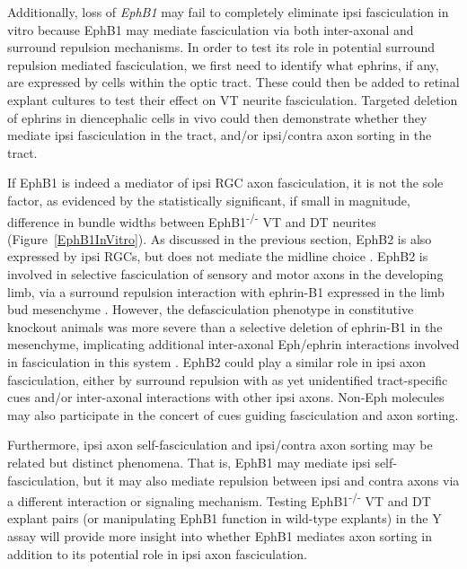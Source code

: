 Additionally, loss of \emph{EphB1} may fail to completely eliminate ipsi fasciculation in vitro because EphB1 may mediate fasciculation via both inter-axonal and surround repulsion mechanisms.
In order to test its role in potential surround repulsion mediated fasciculation, we first need to identify what ephrins, if any, are expressed by cells within the optic tract.
These could then be added to retinal explant cultures to test their effect on VT neurite fasciculation.
Targeted deletion of ephrins in diencephalic cells in vivo could then demonstrate whether they mediate ipsi fasciculation in the tract, and/or ipsi/contra axon sorting in the tract.

If EphB1 is indeed a mediator of ipsi RGC axon fasciculation, it is not the sole factor, as evidenced by the statistically significant, if small in magnitude, difference in bundle widths between EphB1\textsuperscript{-/-} VT and DT neurites (Figure~\ref{EphB1InVitro}).
As discussed in the previous section, EphB2 is also expressed by ipsi RGCs, but does not mediate the midline choice \cite{williams2003ephrin,chenaux2011forward}.
EphB2 is involved in selective fasciculation of sensory and motor axons in the developing limb, via a surround repulsion interaction with ephrin-B1 expressed in the limb bud mesenchyme \cite{luxey2013eph}.
However, the defasciculation phenotype in constitutive knockout animals was more severe than a selective deletion of ephrin-B1 in the mesenchyme, implicating additional inter-axonal Eph/ephrin interactions involved in fasciculation in this system \cite{luxey2013eph}.
EphB2 could play a similar role in ipsi axon fasciculation, either by surround repulsion with as yet unidentified tract-specific cues and/or inter-axonal interactions with other ipsi axons.
Non-Eph molecules may also participate in the concert of cues guiding fasciculation and axon sorting.

Furthermore, ipsi axon self-fasciculation and ipsi/contra axon sorting may be related but distinct phenomena.
That is, EphB1 may mediate ipsi self-fasciculation, but it may also mediate repulsion between ipsi and contra axons via a different interaction or signaling mechanism.
Testing EphB1\textsuperscript{-/-} VT and DT explant pairs (or manipulating EphB1 function in wild-type explants) in the Y assay will provide more insight into whether EphB1 mediates axon sorting in addition to its potential role in ipsi axon fasciculation.